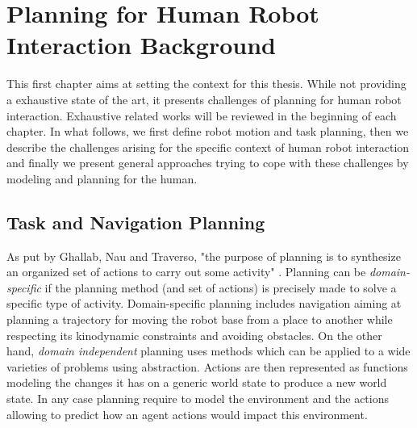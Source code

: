\documentclass[a4paper,11pt,twoside]{StyleThese}
\begin{document}
\setcounter{chapter}{0} %
\dominitoc
\faketableofcontents
\fi

\chapter{Planning for Human Robot Interaction Background}
\minitoc


This first chapter aims at setting the context for this thesis. While not providing a exhaustive state of the art, it presents challenges of planning for human robot interaction. Exhaustive related works will be reviewed in the beginning of each chapter. In what follows, we first define robot motion and task planning, then we describe the challenges arising for the specific context of human robot interaction and finally we present general approaches trying to cope with these challenges by modeling and planning for the human.

\section{Task and Navigation Planning}
As put by Ghallab, Nau and Traverso, "the purpose of planning is to synthesize an organized set of actions to carry out some activity" \cite{ghallab_nau_traverso_2016}. Planning can be \textit{domain-specific} if the planning method (and set of actions) is precisely made to solve a specific type of activity. Domain-specific planning includes navigation aiming at planning a trajectory for moving the robot base from a place to another while respecting its kinodynamic constraints and avoiding obstacles. On the other hand, \textit{domain independent} planning uses methods which can be applied to a wide varieties of problems using abstraction. Actions are then represented as functions modeling the changes it has on a generic world state to produce a new world state. In any case planning require to model the environment and the actions allowing to predict how an agent actions would impact this environment.
\end{document}
